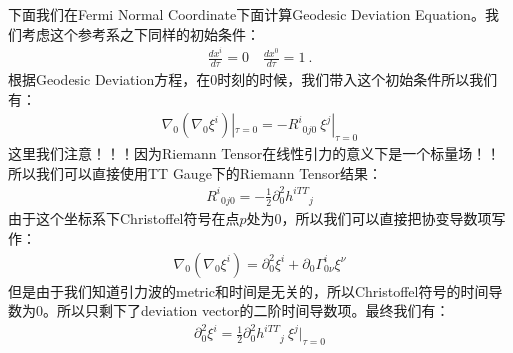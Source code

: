下面我们在Fermi Normal Coordinate下面计算Geodesic Deviation Equation。我们考虑这个参考系之下同样的初始条件：
\begin{align}
  \frac{dx^i}{d\tau} = 0 \quad \frac{dx^0}{d\tau} = 1\mathrm{~.}
\end{align}
根据Geodesic Deviation方程，在0时刻的时候，我们带入这个初始条件所以我们有：
\begin{align}
  \nabla_{0}(\nabla_{0}\xi^{i})|_{\tau=0}=-R^{i}{}_{0j0} \ \xi^{j}|_{\tau=0}
\end{align}
这里我们注意！！！因为Riemann Tensor在线性引力的意义下是一个标量场！！所以我们可以直接使用TT Gauge下的Riemann Tensor结果：
\begin{align}
  R^{i}{}_{0j0}=-\frac{1}{2}\partial_{0}^{2}h^{iTT}{}_{j}
\end{align}
由于这个坐标系下Christoffel符号在点$ p $处为0，所以我们可以直接把协变导数项写作：
\begin{align}
  \nabla_{0}(\nabla_{0}\xi^{i}) = \partial_0^2\xi^i+\partial_0\Gamma_{0\nu}^i\xi^\nu
\end{align}
但是由于我们知道引力波的metric和时间是无关的，所以Christoffel符号的时间导数为0。所以只剩下了deviation vector的二阶时间导数项。最终我们有：
\begin{align}
  \partial_{0}^{2}\xi^{i} = \frac{1}{2}\partial_{0}^{2}h^{iTT}{}_{j} \ \xi^{j}|_{\tau=0}
\end{align}

\bigskip
{}

